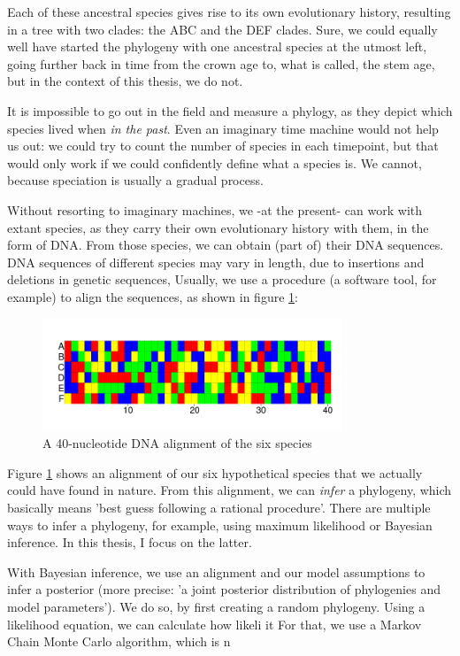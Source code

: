 Each of these ancestral species gives rise to its own evolutionary history,
resulting in a tree with two clades: the ABC and the DEF clades.
Sure, we could equally well have started the phylogeny 
with one ancestral species at the utmost left,
going further back in time from the crown age to, what is called, the stem age,
but in the context of this thesis, we do not.

It is impossible to go out in the field and measure a phylogy, 
as they depict which species lived when \emph{in the past}. 
Even an imaginary time machine would not help us out:
we could try to count the number of species in each timepoint,
but that would only work if we could confidently define what a
species is. We cannot, because speciation is usually a gradual process.

Without resorting to imaginary machines,
we -at the present- can work with extant species, 
as they carry their own evolutionary history with them, 
in the form of DNA. From those species, 
we can obtain (part of) their DNA sequences. 
DNA sequences of different species 
may vary in length, due to insertions and deletions in genetic sequences,
Usually, we use a procedure (a software tool, for example) to align 
the sequences, as shown in figure \ref{fig:alignment}:

\begin{figure}[H]
  \includegraphics[width=0.8\textwidth]{alignment_40.png}
  \caption{
    A 40-nucleotide DNA alignment of the six species
  }
  \label{fig:alignment}
\end{figure}

Figure \ref{fig:alignment} shows an alignment of our six hypothetical species
that we actually could have found in nature. From this alignment, we
can \emph{infer} a phylogeny, which basically means 'best guess following a 
rational procedure'. There are multiple ways to infer a phylogeny, for
example, using maximum likelihood or Bayesian inference. In this thesis, 
I focus on the latter.

With Bayesian inference, we use an alignment and our model assumptions to infer 
a posterior (more 
precise: 'a joint posterior distribution of phylogenies and model parameters').
We do so, by first creating a random phylogeny. Using a likelihood equation,
we can calculate how likeli it  
For that, we use a Markov Chain Monte Carlo algorithm, which is n 


